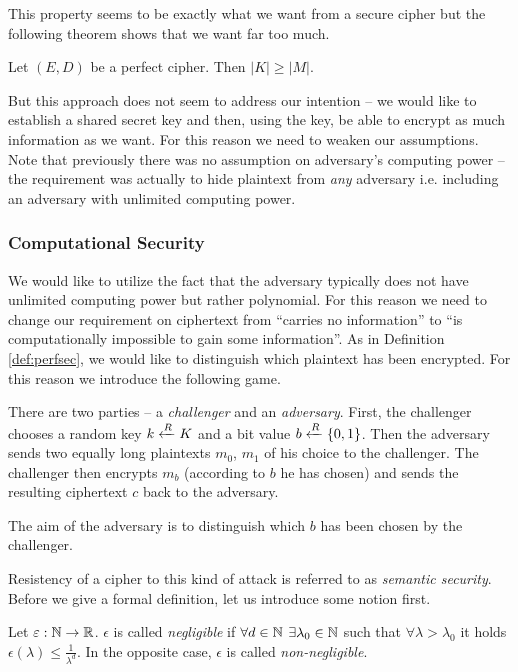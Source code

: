 This property seems to be exactly what we want from a secure cipher but the following theorem shows that we want far too much.

\begin{thm}
	Let $(E,D)$ be a perfect cipher. Then $|K| \geq |M|$.
\end{thm}

But this approach does not seem to address our intention -- we would like to establish a shared secret key and then, using the key, be able to encrypt as much information as we want. For this reason we need to weaken our assumptions. Note that previously there was no assumption on adversary's computing power -- the requirement was actually to hide plaintext from {\em any} adversary i.e. including an adversary with unlimited computing power.

\subsubsection{Computational Security}

We would like to utilize the fact that the adversary typically does not have unlimited computing power but rather polynomial. For this reason we need to change our requirement on ciphertext from ``carries no information'' to ``is computationally impossible to gain some information''. As in Definition \ref{def:perfsec}, we would like to distinguish which plaintext has been encrypted. For this reason we introduce the following game.

\begin{game}
\label{game:semsec}
	There are two parties -- a {\em challenger} and an {\em adversary}. First, the challenger chooses a random key $k\xleftarrow{R} K$ and a bit value $b\xleftarrow{R}\{0,1\}$. Then the adversary sends two equally long plaintexts $m_0$, $m_1$ of his choice to the challenger. The challenger then encrypts $m_b$ (according to $b$ he has chosen) and sends the resulting ciphertext $c$ back to the adversary.
	
	The aim of the adversary is to distinguish which $b$ has been chosen by the challenger.
\end{game}

Resistency of a cipher to this kind of attack is referred to as {\em semantic security}. Before we give a formal definition, let us introduce some notion first.

\begin{defn}
\label{def:neglfunc}
	Let $\varepsilon:\mathbb{N}\rightarrow\mathbb{R}$. $\epsilon$ is called {\em negligible} if $\forall d\in\mathbb{N}$ $\exists \lambda_0\in\mathbb{N}$ such that $\forall \lambda>\lambda_0$ it holds $\epsilon(\lambda)\leq\frac{1}{\lambda^d}$. In the opposite case, $\epsilon$ is called {\em non-negligible}.
\end{defn}

